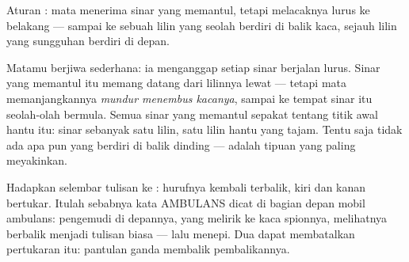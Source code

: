 \begin{omfigure}

{\small Aturan : mata menerima sinar yang memantul, tetapi
melacaknya lurus ke belakang --- sampai ke sebuah lilin yang seolah
berdiri di balik kaca, sejauh lilin yang sungguhan berdiri di depan.}
\end{omfigure}

\begin{example}\label{ex:g5:mirrors-reflection:why}
Matamu berjiwa sederhana: ia menganggap setiap sinar berjalan lurus.
Sinar yang memantul itu memang datang dari lilinnya lewat  ---
tetapi mata memanjangkannya \emph{mundur menembus kacanya}, sampai ke
tempat sinar itu seolah-olah bermula. Semua sinar yang memantul
sepakat tentang titik awal hantu itu: sinar sebanyak satu lilin, satu
lilin hantu yang tajam. Tentu saja tidak ada apa pun yang berdiri di
balik dinding ---  adalah tipuan  yang paling
meyakinkan.
\end{example}

\begin{example}\label{ex:g5:mirrors-reflection:swap}
Hadapkan selembar tulisan ke : hurufnya kembali terbalik, kiri
dan kanan bertukar. Itulah sebabnya kata AMBULANS dicat
 di bagian depan mobil ambulans: pengemudi di depannya,
yang melirik ke kaca spionnya, melihatnya berbalik menjadi tulisan
biasa --- lalu menepi. Dua  dapat membatalkan pertukaran itu:
pantulan ganda membalik pembalikannya.
\end{example}


